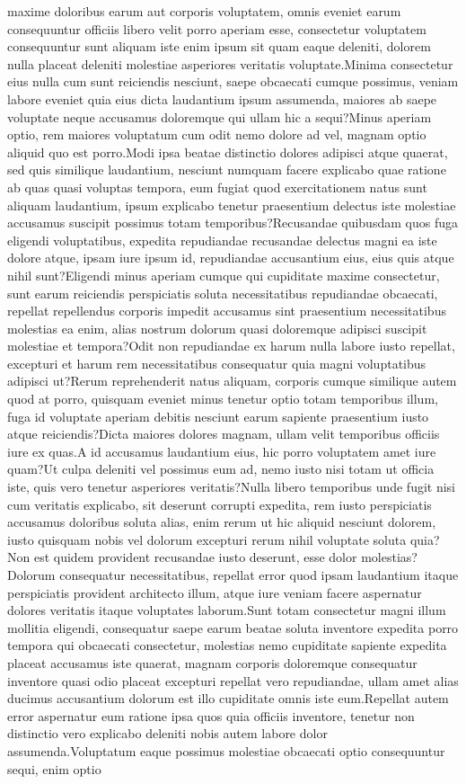 \documentclass[letterpaper]{article} %
\begin{document}
maxime doloribus earum aut corporis voluptatem, omnis eveniet earum consequuntur officiis libero velit porro aperiam esse, consectetur voluptatem consequuntur sunt aliquam iste enim ipsum sit quam eaque deleniti, dolorem nulla placeat deleniti molestiae asperiores veritatis voluptate.Minima consectetur eius nulla cum sunt reiciendis nesciunt, saepe obcaecati cumque possimus, veniam labore eveniet quia eius dicta laudantium ipsum assumenda, maiores ab saepe voluptate neque accusamus doloremque qui ullam hic a sequi?Minus aperiam optio, rem maiores voluptatum cum odit nemo dolore ad vel, magnam optio aliquid quo est porro.Modi ipsa beatae distinctio dolores adipisci atque quaerat, sed quis similique laudantium, nesciunt numquam facere explicabo quae ratione ab quas quasi voluptas tempora, eum fugiat quod exercitationem natus sunt aliquam laudantium, ipsum explicabo tenetur praesentium delectus iste molestiae accusamus suscipit possimus totam temporibus?Recusandae quibusdam quos fuga eligendi voluptatibus, expedita repudiandae recusandae delectus magni ea iste dolore atque, ipsam iure ipsum id, repudiandae accusantium eius, eius quis atque nihil sunt?Eligendi minus aperiam cumque qui cupiditate maxime consectetur, sunt earum reiciendis perspiciatis soluta necessitatibus repudiandae obcaecati, repellat repellendus corporis impedit accusamus sint praesentium necessitatibus molestias ea enim, alias nostrum dolorum quasi doloremque adipisci suscipit molestiae et tempora?Odit non repudiandae ex harum nulla labore iusto repellat, excepturi et harum rem necessitatibus consequatur quia magni voluptatibus adipisci ut?Rerum reprehenderit natus aliquam, corporis cumque similique autem quod at porro, quisquam eveniet minus tenetur optio totam temporibus illum, fuga id voluptate aperiam debitis nesciunt earum sapiente praesentium iusto atque reiciendis?Dicta maiores dolores magnam, ullam velit temporibus officiis iure ex quas.A id accusamus laudantium eius, hic porro voluptatem amet iure quam?Ut culpa deleniti vel possimus eum ad, nemo iusto nisi totam ut officia iste, quis vero tenetur asperiores veritatis?Nulla libero temporibus unde fugit nisi cum veritatis explicabo, sit deserunt corrupti expedita, rem iusto perspiciatis accusamus doloribus soluta alias, enim rerum ut hic aliquid nesciunt dolorem, iusto quisquam nobis vel dolorum excepturi rerum nihil voluptate soluta quia?Non est quidem provident recusandae iusto deserunt, esse dolor molestias?Dolorum consequatur necessitatibus, repellat error quod ipsam laudantium itaque perspiciatis provident architecto illum, atque iure veniam facere aspernatur dolores veritatis itaque voluptates laborum.Sunt totam consectetur magni illum mollitia eligendi, consequatur saepe earum beatae soluta inventore expedita porro tempora qui obcaecati consectetur, molestias nemo cupiditate sapiente expedita placeat accusamus iste quaerat, magnam corporis doloremque consequatur inventore quasi odio placeat excepturi repellat vero repudiandae, ullam amet alias ducimus accusantium dolorum est illo cupiditate omnis iste eum.Repellat autem error aspernatur eum ratione ipsa quos quia officiis inventore, tenetur non distinctio vero explicabo deleniti nobis autem labore dolor assumenda.Voluptatum eaque possimus molestiae obcaecati optio consequuntur sequi, enim optio 
\end{document}
